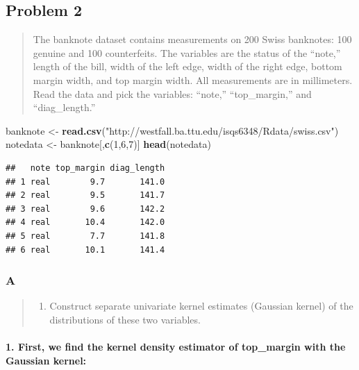 \documentclass[
]{article}
\newenvironment{Shaded}{\begin{snugshade}}{\end{snugshade}}
\newcommand{\DecValTok}[1]{\textcolor[rgb]{0.00,0.00,0.81}{#1}}
\newcommand{\KeywordTok}[1]{\textcolor[rgb]{0.13,0.29,0.53}{\textbf{#1}}}
\newcommand{\NormalTok}[1]{#1}
\newcommand{\StringTok}[1]{\textcolor[rgb]{0.31,0.60,0.02}{#1}}
\providecommand{\tightlist}{%
  \setlength{\itemsep}{0pt}\setlength{\parskip}{0pt}}
\begin{document}
\hypertarget{problem-2}{%
\subsection{Problem 2}\label{problem-2}}

\begin{quote}
The banknote dataset contains measurements on 200 Swiss banknotes: 100
genuine and 100 counterfeits. The variables are the status of the
``note,'' length of the bill, width of the left edge, width of the right
edge, bottom margin width, and top margin width. All measurements are in
millimeters. Read the data and pick the variables: ``note,''
``top\_margin,'' and ``diag\_length.''
\end{quote}

\begin{Shaded}
\begin{Highlighting}[]
\NormalTok{banknote <-}\StringTok{ }\KeywordTok{read.csv}\NormalTok{(}\StringTok{"http://westfall.ba.ttu.edu/isqs6348/Rdata/swiss.csv"}\NormalTok{) }
\NormalTok{notedata <-}\StringTok{ }\NormalTok{banknote[,}\KeywordTok{c}\NormalTok{(}\DecValTok{1}\NormalTok{,}\DecValTok{6}\NormalTok{,}\DecValTok{7}\NormalTok{)]}
\KeywordTok{head}\NormalTok{(notedata)}
\end{Highlighting}
\end{Shaded}

\begin{verbatim}
##   note top_margin diag_length
## 1 real        9.7       141.0
## 2 real        9.5       141.7
## 3 real        9.6       142.2
## 4 real       10.4       142.0
## 5 real        7.7       141.8
## 6 real       10.1       141.4
\end{verbatim}

\hypertarget{a}{%
\subsubsection{A}\label{a}}

\begin{quote}
\begin{enumerate}
\def\labelenumi{\alph{enumi})}
\tightlist
\item
  Construct separate univariate kernel estimates (Gaussian kernel) of
  the distributions of these two variables.
\end{enumerate}
\end{quote}

\hypertarget{first-we-find-the-kernel-density-estimator-of-top_margin-with-the-gaussian-kernel}{%
\paragraph{\texorpdfstring{\textbf{1. First, we find the kernel density
estimator of top\_margin with the Gaussian
kernel:}}{1. First, we find the kernel density estimator of top\_margin with the Gaussian kernel:}}\label{first-we-find-the-kernel-density-estimator-of-top_margin-with-the-gaussian-kernel}}
\end{document}
